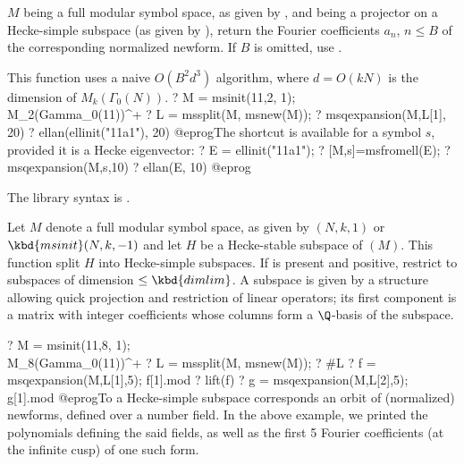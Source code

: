 \label{se:msqexpansion}
$M$ being a full modular symbol space, as given by ,
and  being a projector on a Hecke-simple subspace (as given
by ), return the Fourier coefficients $a_n$, $n\leq B$ of the
corresponding normalized newform. If $B$ is omitted, use
.

This function uses a naive $O(B^2 d^3)$
algorithm, where $d = O(kN)$ is the dimension of $M_k(\Gamma_0(N))$.
\bprog
? M = msinit(11,2, 1); \\ M_2(Gamma_0(11))^+
? L = mssplit(M, msnew(M));
? msqexpansion(M,L[1], 20)
? ellan(ellinit("11a1"), 20)
@eprog\noindent The shortcut  is available for
a symbol $s$, provided it is a Hecke eigenvector:
\bprog
? E = ellinit("11a1");
? [M,s]=msfromell(E);
? msqexpansion(M,s,10)
? ellan(E, 10)
@eprog

The library syntax is .

\label{se:mssplit}
Let $M$ denote a full modular symbol space, as given by $(N,k,1)$
or $\kbd{msinit}(N,k,-1)$ and let $H$ be a Hecke-stable subspace of
$(M)$. This function split $H$ into Hecke-simple subspaces. If
 is present and positive, restrict to subspaces of dimension
$\leq \kbd{dimlim}$. A subspace is given by a structure allowing quick
projection and restriction of linear operators; its first component is a
matrix with integer coefficients whose columns form a $\Q$-basis of the
subspace.

\bprog
? M = msinit(11,8, 1); \\ M_8(Gamma_0(11))^+
? L = mssplit(M, msnew(M));
? #L
? f = msqexpansion(M,L[1],5); f[1].mod
? lift(f)
? g = msqexpansion(M,L[2],5); g[1].mod
@eprog\noindent To a Hecke-simple subspace corresponds an orbit of
(normalized) newforms, defined over a number field. In the above example,
we printed the polynomials defining the said fields, as well as the first
5 Fourier coefficients (at the infinite cusp) of one such form.

